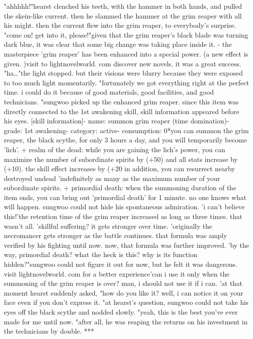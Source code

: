 "ahhhhh!"hearst clenched his teeth, with the hammer in both hands, and pulled the skein-like current.
 then he slammed the hammer at the grim reaper with all his might.
then the current flew into the grim reaper, to everybody's surprise.
"come on! get into it, please!"given that the grim reaper's black blade was turning dark blue, it was clear that some big change was taking place inside it.
- the masterpiece 'grim reaper' has been enhanced into a special power.
 (a new effect is given.
)visit to lightnovelworld.
com discover new novels.
it was a great success.
"ha…"the light stopped.
 but their visions were blurry because they were exposed to too much light momentarily.
"fortunately we got everything right at the perfect time.
 i could do it because of good materials, good facilities, and good technicians.
"sungwoo picked up the enhanced grim reaper.
 since this item was directly connected to the 1st awakening skill, skill information appeared before his eyes.
[skill information]- name: summon grim reaper (time domination)- grade: 1st awakening- category: active- consumption: 0*you can summon the grim reaper, the black scythe, for only 3 hours a day, and you will temporarily become 'lich'.
+ realm of the dead: while you are gaining the lich's power, you can maximize the number of subordinate spirits by (+50) and all stats increase by (+10).
 the skill effect increases by (+20%
 in addition, you can resurrect nearby destroyed undead 'indefinitely as many as the maximum number of your subordinate spirits.
+ primordial death: when the summoning duration of the item ends, you can bring out 'primordial death' for 1 minute.
 no one knows what will happen.
sungwoo could not hide his spontaneous admiration.
'i can't believe this!'the retention time of the grim reaper increased as long as three times.
 that wasn't all.
'skillful suffering? it gets stronger over time.
'originally the necromancer gets stronger as the battle continues.
 that formula was amply verified by his fighting until now.
 now, that formula was further improved.
'by the way, primordial death? what the heck is this? why is its function hidden?"sungwoo could not figure it out for now, but he felt it was dangerous.
visit lightnovelworld.
com for a better experience'can i use it only when the summoning of the grim reaper is over? man, i should not use it if i can.
'at that moment hearst suddenly asked, "how do you like it? well, i can notice it on your face even if you don't express it.
"at hearst's question, sungwoo could not take his eyes off the black scythe and nodded slowly.
"yeah, this is the best you've ever made for me until now.
"after all, he was reaping the returns on his investment in the technicians by double.
***


